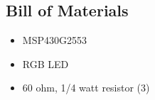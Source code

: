 \documentclass{hitec}
\begin{document}
\subsection{Bill of Materials}
\begin{itemize}
    \item MSP430G2553
    \item RGB LED
    \item 60 ohm, 1/4 watt resistor (3)
\end{itemize}




\end{document}
